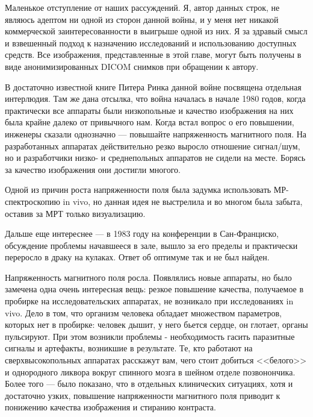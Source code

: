 Маленькое отступление от наших рассуждений. Я, автор данных строк, не являюсь адептом ни одной из сторон данной войны, и у меня нет никакой коммерческой заинтересованности в выигрыше одной из них. Я за здравый смысл и взвешенный подход к назначению исследований и использованию доступных средств. Все изображения, представленные в этой главе, могут быть получены в виде анонимизированных DICOM снимков при обращении к автору.

В достаточно известной книге Питера Ринка\cite{Rinck.MagnResInMed.1993} данной войне посвящена отдельная интерлюдия. Там же дана отсылка, что война началась в начале 1980 годов, когда практически все аппараты были низкопольные и качество изображения на них была крайне далеко от привычного нам. Когда встал вопрос о его повышении, инженеры сказали однозначно --- повышайте напряженность магнитного поля. На разработанных аппаратах действительно резко выросло отношение сигнал/шум, но и разработчики низко- и среднепольных аппаратов не сидели на месте. Борясь за качество изображения они достигли многого.

Одной из причин роста напряженности поля была задумка использовать МР-спектроскопию in vivo, но данная идея не выстрелила и во многом была забыта, оставив за МРТ только визуализацию.

Дальше еще интереснее --- в 1983 году на конференции в Сан-Франциско, обсуждение проблемы начавшееся в зале, вышло за его пределы и практически переросло в драку на кулаках. Ответ об оптимуме так и не был найден. 

Напряженность магнитного поля росла. Появлялись новые аппараты, но было замечена одна очень интересная вещь: резкое повышение качества, получаемое в пробирке на исследовательских аппаратах, не возникало при исследованиях in vivo. Дело в том, что организм человека обладает множеством параметров, которых нет в пробирке: человек дышит, у него бьется сердце, он глотает, органы пульсируют. При этом возникли проблемы - необходимость гасить паразитные сигналы и артефакты, возникшие в результате. Те, кто работают на сверхвысокопольных аппаратах расскажут вам, чего стоит добиться <<белого>> и однородного ликвора вокруг спинного мозга в шейном отделе позвонончика. Более того --- было показано, что в отдельных клинических ситуациях, хотя и достаточно узких, повышение напряженности магнитного поля приводит к понижению качества изображения и стиранию контраста.

